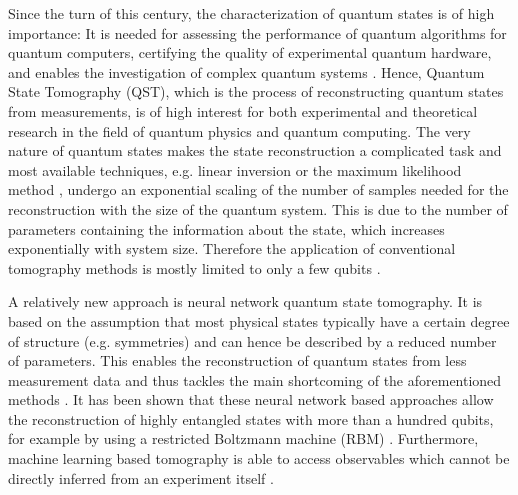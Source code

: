 \documentclass[pra,aps,showpacs,groupedaddress,superscriptaddress,twocolumn,toc=flat,biblatex,footinbib]{revtex4-1}
\begin{document}
Since the turn of this century, the characterization of quantum states is of high importance: It is needed for assessing the performance of quantum algorithms for quantum computers, certifying the quality of experimental quantum hardware, and enables the investigation of complex quantum systems \cite{Nimbe2021, Bloch2012,Preskill2018,Altman2021}. Hence, Quantum State Tomography (QST), which is the process of reconstructing quantum states from measurements, is of high interest for both experimental and theoretical research in the field of quantum physics and quantum computing. The very nature of quantum states makes the state reconstruction a complicated task and most available techniques, e.g. linear inversion or the maximum likelihood method \cite{Haeffner2005, Hradil1997}, undergo an exponential scaling of the number of samples needed for the reconstruction with the size of the quantum system. This is due to the number of parameters containing the information about the state, which increases exponentially with system size. Therefore the application of conventional tomography methods is mostly limited to only a few qubits \cite{Abhijith2020}. 

A relatively new approach is neural network quantum state tomography. It is based on the assumption that most physical states typically have a certain degree of structure (e.g. symmetries) and can hence be described  by a reduced number of parameters. This enables the reconstruction of quantum states from less measurement data and thus tackles the main shortcoming of the aforementioned methods \cite{Carrasquilla2019,Torlai2020,Carrasquilla2021}. It has been shown that these neural network based approaches allow the reconstruction of highly entangled states with more than a hundred qubits, for example by using a restricted Boltzmann machine (RBM) \cite{Torlai2018,Melko2019}. Furthermore, machine learning based tomography is able to access observables which cannot be directly inferred from an experiment itself \cite{Torlai2019}.
\end{document}
